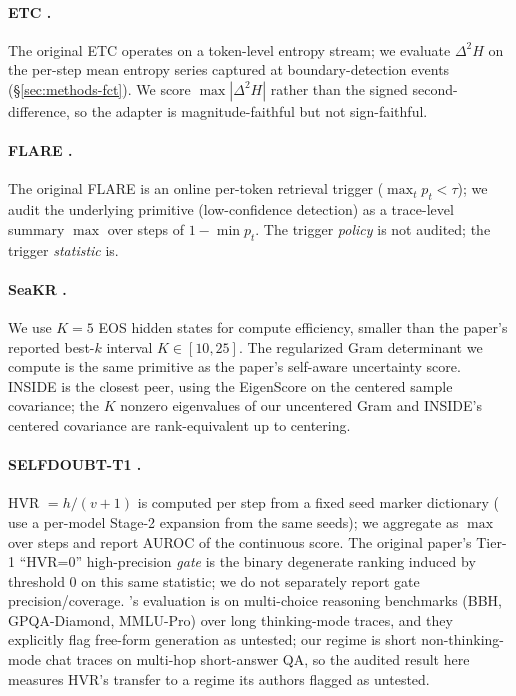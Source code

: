 \documentclass[11pt]{article}
\begin{document}
\paragraph{ETC \citep{li_modeling_2026}.} The original ETC operates on a token-level entropy stream; we evaluate $\Delta^2 H$ on the per-step mean entropy series captured at boundary-detection events (\S\ref{sec:methods-fct}). We score $\max |\Delta^2 H|$ rather than the signed second-difference, so the adapter is magnitude-faithful but not sign-faithful.

\paragraph{FLARE \citep{jiang_active_2023}.} The original FLARE is an online per-token retrieval trigger ($\max_t p_t < \tau$); we audit the underlying primitive (low-confidence detection) as a trace-level summary $\max$ over steps of $1 - \min p_t$. The trigger \emph{policy} is not audited; the trigger \emph{statistic} is.

\paragraph{SeaKR \citep{yao_seakr_2025}.} We use $K{=}5$ EOS hidden states for compute efficiency, smaller than the paper's reported best-$k$ interval $K \in [10, 25]$. The regularized Gram determinant we compute is the same primitive as the paper's self-aware uncertainty score. INSIDE \citep{chen_inside_2024} is the closest peer, using the EigenScore on the centered sample covariance; the $K$ nonzero eigenvalues of our uncentered Gram and INSIDE's centered covariance are rank-equivalent up to centering.

\paragraph{SELFDOUBT-T1 \citep{pandey_selfdoubt_2026}.} HVR $= h/(v+1)$ is computed per step from a fixed seed marker dictionary (\citeauthor{pandey_selfdoubt_2026} use a per-model Stage-2 expansion from the same seeds); we aggregate as $\max$ over steps and report AUROC of the continuous score. The original paper's Tier-1 ``HVR=0'' high-precision \emph{gate} is the binary degenerate ranking induced by threshold $0$ on this same statistic; we do not separately report gate precision/coverage. \citeauthor{pandey_selfdoubt_2026}'s evaluation is on multi-choice reasoning benchmarks (BBH, GPQA-Diamond, MMLU-Pro) over long thinking-mode traces, and they explicitly flag free-form generation as untested; our regime is short non-thinking-mode chat traces on multi-hop short-answer QA, so the audited result here measures HVR's transfer to a regime its authors flagged as untested.
\end{document}
